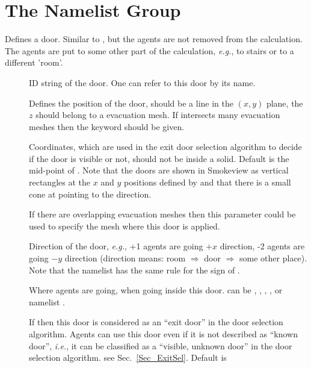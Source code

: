 \documentclass[12pt,a4paper,final,twoside]{stylevk}
\begin{document}
\section{The  Namelist Group}\label{Sec_DoorNML}

\noindent Defines a door.  Similar to , but the agents are
not removed from the calculation.  The agents are put to some other
part of the calculation, \emph{e.g.}, to stairs or to a different
'room'.

\begin{description}
%
\item[] ID string of the door. One can refer to this door by
  its name.
%
\item[] Defines the position of the door, should be a line
  in the $(x,y)$ plane, the $z$ should belong to a evacuation mesh.
  If  intersects many evacuation meshes then the keyword
   should be given. 
%
\item[] Coordinates, which are used in the exit door
  selection algorithm to decide if the door is visible or not, should
  not be inside a solid.  Default is the mid-point of .
  Note that the doors are shown in Smokeview as vertical rectangles at
  the $x$ and $y$ positions defined by  and that there is a
  small cone at  pointing to the  direction.
%
\item[] If there are overlapping evacuation meshes
  then this parameter could be used to specify the mesh where this
  door is applied.
%
\item[] Direction of the door, \emph{e.g.}, +1 agents are
  going $+x$ direction, -2 agents are going $-y$ direction (direction
  means: room $\Rightarrow$ door $\Rightarrow$ some other place).
  Note that the namelist  has the same rule for the sign
  of .
%
\item[] Where agents are going, when going inside this
  door.   can be , ,
  , , or  namelist .
%
\item[] If  then this door is
  considered as an ``exit door'' in the door selection algorithm.
  Agents can use this door even if it is not described as ``known
  door'', \emph{i.e.}, it can be classified as a ``visible, unknown
  door'' in the door selection algorithm. see Sec.~\ref{Sec_ExitSel}.
  Default is 

\end{description}
\end{document}
